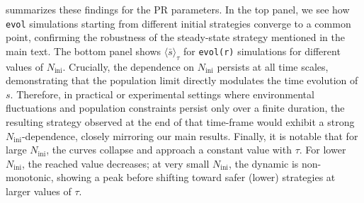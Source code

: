 \documentclass[aps,pre,reprint,10pt,superscriptaddress]{revtex4-2}
\begin{document}
\begin{appendices}
     summarizes these findings for the PR parameters. In the top panel, we see how \texttt{evol} simulations starting from different initial strategies converge to a common point, confirming the robustness of the steady-state strategy mentioned in the main text. The bottom panel shows $\langle\bar{s}\rangle_\tau$ for \texttt{evol(r)} simulations for different values of $N_\text{ini}$. Crucially, the dependence on $N_\text{ini}$ persists at all time scales, demonstrating that the population limit directly modulates the time evolution of $s$. Therefore, in practical or experimental settings where environmental fluctuations and population constraints persist only over a finite duration, the resulting strategy observed at the end of that time-frame would exhibit a strong $N_\text{ini}$-dependence, closely mirroring our main results. Finally, it is notable that for large $N_\text{ini}$, the curves collapse and approach a constant value with $\tau$. For lower $N_\text{ini}$, the reached value decreases; at very small $N_\text{ini}$, the dynamic is non-monotonic, showing a peak before shifting toward safer (lower) strategies at larger values of $\tau$.

\end{appendices}


\end{document}
